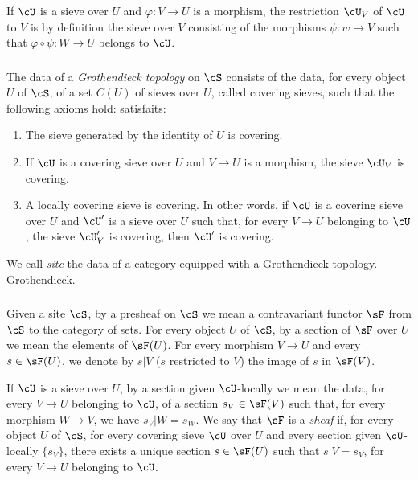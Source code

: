 If $\cU$ is a sieve over $U$ and $\varphi:V\to U$ is a morphism, the 
restriction $\cU_V$ of $\cU$ to $V$ is by definition the sieve over $V$ 
consisting of the morphisms $\psi:w\to V$ such that 
$\varphi\circ\psi:W\to U$ belongs to $\cU$.





\subsubsection{}\label{I:1-6-2}

The data of a \emph{Grothendieck topology} on $\cS$ consists of the data, for every object $U$ of $\cS$, 
of a set $C(U)$ of sieves over $U$, 
called covering sieves, such that the following axioms hold: 
satisfaits:
\begin{enumerate}[\indent a)]
  \item The sieve generated by the identity of $U$ is covering.
  \item If $\cU$ is a covering sieve over $U$ and $V\to U$ is a 
    morphism, the sieve $\cU_V$ is covering.
  \item A locally covering sieve is covering. In other words, if $\cU$ is 
    a covering sieve over $U$ and $\cU'$ is a sieve over $U$ such that, for 
    every $V\to U$ belonging to $\cU$, the sieve $\cU_V'$ is covering, then 
    $\cU'$ is covering.
\end{enumerate}

We call \emph{site} the data of a category equipped with a Grothendieck topology. 
Grothendieck.





\subsubsection{}\label{I:1-6-3}

Given a site $\cS$, by a presheaf on $\cS$ we mean a contravariant functor 
$\sF$ from $\cS$ to the category of sets. For every 
object $U$ of $\cS$, by a section of $\sF$ over $U$ we mean the 
elements of $\sF(U)$. For every morphism $V\to U$ and every 
$s\in \sF(U)$, we denote by $s|V$ ($s$ restricted to $V$) the image of $s$ in 
$\sF(V)$.

If $\cU$ is a sieve over $U$, by a section given $\cU$-locally we mean the data, 
for every $V\to U$ belonging to $\cU$, of a section 
$s_V\in\sF(V)$ such that, for every morphism $W\to V$, we have $s_V|W=s_W$. We 
say that $\sF$ is a \emph{sheaf} if, for every object $U$ of $\cS$, for 
every covering sieve $\cU$ over $U$ and every section given 
$\cU$-locally $\{s_V\}$, there exists a unique section $s\in\sF(U)$ such that 
$s|V=s_V$, for every $V\to U$ belonging to $\cU$. 

